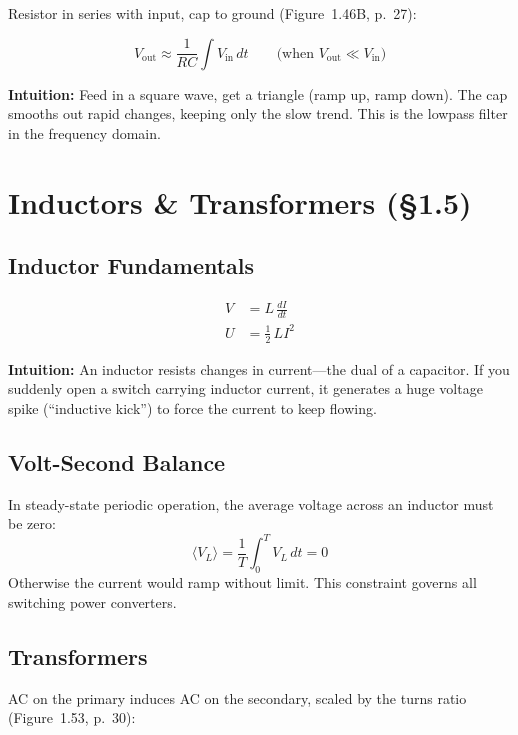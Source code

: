 \documentclass[11pt,a4paper]{article}
\newcommand{\intuition}[1]{\par\textcolor{intuition}{\textbf{Intuition:}} #1}
\begin{document}
Resistor in series with input, cap to ground (Figure~1.46B, p.~27):

\begin{equation}
V_{\text{out}} \approx \frac{1}{RC} \int V_{\text{in}} \, dt \qquad \text{(when } V_{\text{out}} \ll V_{\text{in}}\text{)}
\end{equation}

\intuition{Feed in a square wave, get a triangle (ramp up, ramp down). The cap smooths out rapid changes, keeping only the slow trend. This is the lowpass filter in the frequency domain.}

\section{Inductors \& Transformers (\S1.5)}

\subsection{Inductor Fundamentals}

\begin{align}
V &= L\,\frac{dI}{dt} \tag{voltage $\propto$ rate of current change} \\
U &= \tfrac{1}{2}\,LI^2 \tag{stored energy in magnetic field}
\end{align}

\intuition{An inductor resists changes in current---the dual of a capacitor. If you suddenly open a switch carrying inductor current, it generates a huge voltage spike (``inductive kick'') to force the current to keep flowing.}

\subsection{Volt-Second Balance}

In steady-state periodic operation, the average voltage across an inductor must be zero:
\[
\langle V_L \rangle = \frac{1}{T}\int_0^T V_L\,dt = 0
\]
Otherwise the current would ramp without limit. This constraint governs all switching power converters.

\subsection{Transformers}

AC on the primary induces AC on the secondary, scaled by the turns ratio (Figure~1.53, p.~30):
\end{document}
